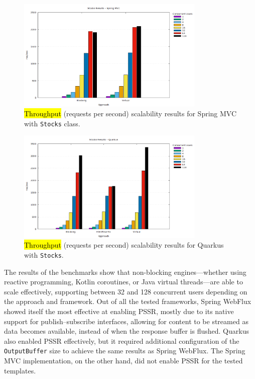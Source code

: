 \documentclass[software,article,accept,pdftex,moreauthors]{Definitions/mdpi}
\begin{document}
\begin{figure}[H]
\vspace{-3pt}
     \includegraphics[width=0.8\textwidth]{./Graphs/stocks-springmvc-jmeter.png}
     \caption{\hl{Throughput} %
 (requests per second) scalability results for Spring MVC with \texttt{Stocks} class.}\label{fig:stocks-springmvc-jmeter}
\end{figure}
\vspace{-6pt}
\begin{figure}[H]

     \includegraphics[width=0.8\textwidth]{./Graphs/stocks-quarkus-jmeter.png}
     \caption{\hl{Throughput} %
 (requests per second) scalability results for Quarkus with \texttt{Stocks}.}\label{fig:stocks-quarkus-jmeter}
\end{figure}



The results of the benchmarks show that non-blocking engines---whether using
reactive programming, Kotlin coroutines, or Java virtual threads---are able to
scale effectively, supporting between 32 and 128 concurrent users depending on
the approach and framework. Out of all the tested frameworks, Spring WebFlux
showed itself the most effective at enabling PSSR, mostly due to its native
support for publish--subscribe interfaces, allowing for content to be streamed
as data becomes available, instead of when the response buffer is flushed.
Quarkus also enabled PSSR effectively, but it required additional configuration
of the \texttt{OutputBuffer} size to achieve the same results as Spring
WebFlux. The Spring MVC implementation, on the other hand, did not enable PSSR
for the tested templates.
\end{document}
